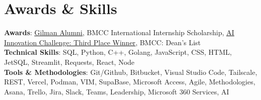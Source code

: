\documentclass[letterpaper,10pt]{article}
\begin{document}
\section{Awards \& Skills}
\begin{itemize}[leftmargin=0.15in, label={}]
    \small{\item{
    \textbf{Awards}: {\underline{\href{https://drive.google.com/file/d/1jiuWnsTUp3PDommo-ShgpSnyoEbazDzw/view?usp=sharing}{Gilman Alumni}}}, BMCC International Internship Scholarship, {\underline{\href{https://sites.google.com/view/bmcchacksai/fall-2024-winners/ai-innovation-track}{AI Innovation Challenge: Third Place Winner}}}, BMCC: Dean's List \\
     \textbf{Technical Skills}: SQL, Python, C++, Golang, JavaScript, CSS, HTML, JetSQL, Streamlit, Requests, React, Node \\
     \textbf{Tools \& Methodologies}: Git/Github, Bitbucket, Visual Studio Code, Tailscale, REST, Vercel, Podman, VIM, SupaBase, Microsoft Access, Agile, Methodologies, Asana, Trello, Jira, Slack, Teams, Leadership, Microsoft 360 Services, AI  \\
    }}
\end{itemize}
\end{document}
